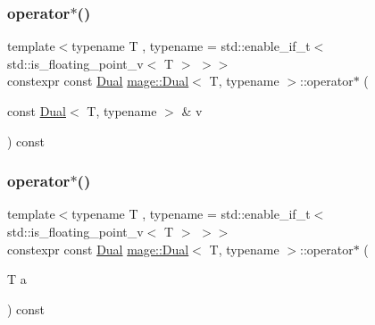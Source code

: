 \mbox{\label{structmage_1_1_dual_acc355c1f43db531500a1b017bc700e7c}} 
\subsubsection{\texorpdfstring{operator$\ast$()}{operator*()}\hspace{0.1cm}{\footnotesize\ttfamily [1/2]}}
{\footnotesize\ttfamily template$<$typename T , typename  = std\+::enable\+\_\+if\+\_\+t$<$ std\+::is\+\_\+floating\+\_\+point\+\_\+v$<$ T $>$ $>$$>$ \\
constexpr const \mbox{\hyperlink{structmage_1_1_dual}{Dual}} \mbox{\hyperlink{structmage_1_1_dual}{mage\+::\+Dual}}$<$ T, typename $>$\+::operator$\ast$ (\begin{DoxyParamCaption}\item[{const \mbox{\hyperlink{structmage_1_1_dual}{Dual}}$<$ T, typename $>$ \&}]{v }\end{DoxyParamCaption}) const\hspace{0.3cm}{\ttfamily [noexcept]}}

\mbox{\label{structmage_1_1_dual_a26be9e8612de0ca9d382b9ef9080c306}} 
\subsubsection{\texorpdfstring{operator$\ast$()}{operator*()}\hspace{0.1cm}{\footnotesize\ttfamily [2/2]}}
{\footnotesize\ttfamily template$<$typename T , typename  = std\+::enable\+\_\+if\+\_\+t$<$ std\+::is\+\_\+floating\+\_\+point\+\_\+v$<$ T $>$ $>$$>$ \\
constexpr const \mbox{\hyperlink{structmage_1_1_dual}{Dual}} \mbox{\hyperlink{structmage_1_1_dual}{mage\+::\+Dual}}$<$ T, typename $>$\+::operator$\ast$ (\begin{DoxyParamCaption}\item[{T}]{a }\end{DoxyParamCaption}) const\hspace{0.3cm}{\ttfamily [noexcept]}}

\mbox{\label{structmage_1_1_dual_a3fb1bc0b5ddee2e8a3edc72063d129f6}} 
